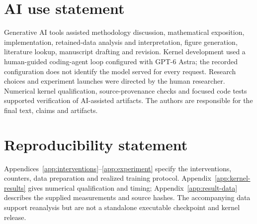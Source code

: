 \section*{AI use statement}
Generative AI tools assisted methodology discussion, mathematical exposition,
implementation, retained-data analysis and interpretation, figure generation,
literature lookup, manuscript drafting and revision. Kernel development used
a human-guided coding-agent loop configured with GPT-6 Astra; the recorded
configuration does not identify the model served for every request.
Research choices and experiment launches were directed by the human
researcher. Numerical kernel qualification, source-provenance checks and
focused code tests supported verification of AI-assisted artifacts.
The authors are responsible for the final text, claims and artifacts.

\section*{Reproducibility statement}
Appendices~\ref{app:interventions}--\ref{app:experiment} specify the
interventions, counters, data preparation and realized training protocol.
Appendix~\ref{app:kernel-results} gives numerical qualification and timing;
Appendix~\ref{app:result-data} describes the supplied measurements and source
hashes. The accompanying data support reanalysis but are not a standalone
executable checkpoint and kernel release.
